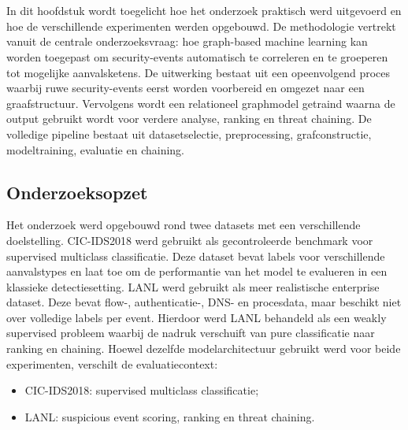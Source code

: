 
\chapter{}%
\label{ch:methodologie}

In dit hoofdstuk wordt toegelicht hoe het onderzoek praktisch werd uitgevoerd en hoe de verschillende experimenten werden opgebouwd. De methodologie vertrekt vanuit de centrale onderzoeksvraag: hoe graph-based machine learning kan worden toegepast om security-events automatisch te correleren en te groeperen tot mogelijke aanvalsketens.
\newline
\newline
De uitwerking bestaat uit een opeenvolgend proces waarbij ruwe security-events eerst worden voorbereid en omgezet naar een graafstructuur. Vervolgens wordt een relationeel graphmodel getraind waarna de output gebruikt wordt voor verdere analyse, ranking en threat chaining.
\newline
\newline
De volledige pipeline bestaat uit datasetselectie, preprocessing, grafconstructie, modeltraining, evaluatie en chaining.

\section{Onderzoeksopzet}

Het onderzoek werd opgebouwd rond twee datasets met een verschillende doelstelling.
\newline
\newline
CIC-IDS2018 werd gebruikt als gecontroleerde benchmark voor supervised multiclass classificatie. Deze dataset bevat labels voor verschillende aanvalstypes en laat toe om de performantie van het model te evalueren in een klassieke detectiesetting.
\newline
\newline
LANL werd gebruikt als meer realistische enterprise dataset. Deze bevat flow-, authenticatie-, DNS- en procesdata, maar beschikt niet over volledige labels per event. Hierdoor werd LANL behandeld als een weakly supervised probleem waarbij de nadruk verschuift van pure classificatie naar ranking en chaining.
\newline
\newline
Hoewel dezelfde modelarchitectuur gebruikt werd voor beide experimenten, verschilt de evaluatiecontext:
\begin{itemize}
    \item CIC-IDS2018: supervised multiclass classificatie;
    \item LANL: suspicious event scoring, ranking en threat chaining.
\end{itemize}

